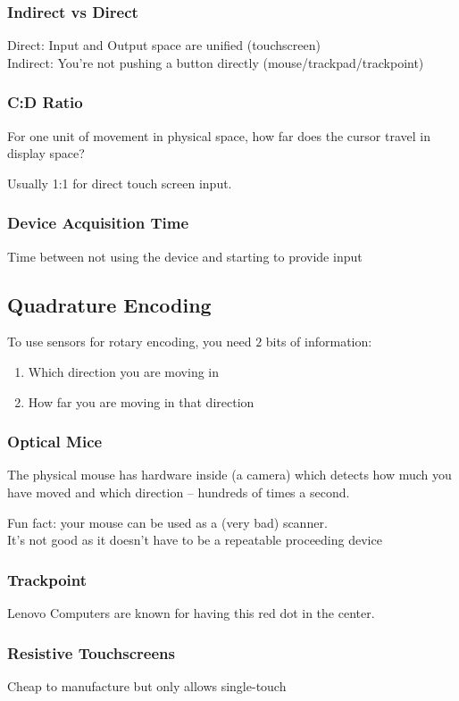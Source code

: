 \subsubsection{Indirect vs Direct}
Direct: Input and Output space are unified (touchscreen)\\
Indirect: You're not pushing a button directly (mouse/trackpad/trackpoint)

\subsubsection{C:D Ratio}
For one unit of movement in physical space, how far does the 
cursor travel in display space?

Usually 1:1 for direct touch screen input.

\subsubsection{Device Acquisition Time}
Time between not using the device and starting to provide 
input

\subsection{Quadrature Encoding}
To use sensors for rotary encoding, you need $2$ bits of information:
\begin{enumerate}
    \item Which direction you are moving in
    \item How far you are moving in that direction
\end{enumerate}

\subsubsection{Optical Mice}
The physical mouse has hardware inside (a camera) which detects how much you have moved and which direction -- hundreds of times a second.

Fun fact: your mouse can be used as a (very bad) scanner.\\
It's not good as it doesn't have to be a repeatable proceeding device

\subsubsection{Trackpoint}
Lenovo Computers are known for having this red dot in the center.

\subsubsection{Resistive Touchscreens}
Cheap to manufacture  but only allows single-touch

